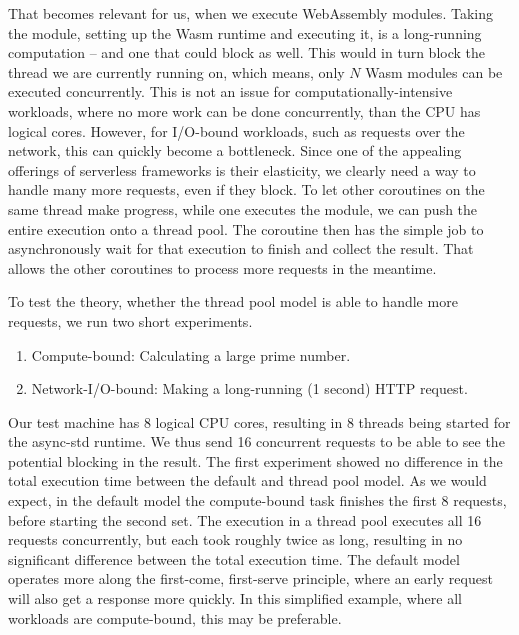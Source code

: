 That becomes relevant for us, when we execute WebAssembly modules. Taking the module, setting up the Wasm runtime and executing it, is a long-running computation -- and one that could block as well. This would in turn block the thread we are currently running on, which means, only $N$ Wasm modules can be executed concurrently. This is not an issue for computationally-intensive workloads, where no more work can be done concurrently, than the CPU has logical cores. However, for I/O-bound workloads, such as requests over the network, this can quickly become a bottleneck. Since one of the appealing offerings of serverless frameworks is their elasticity, we clearly need a way to handle many more requests, even if they block.
To let other coroutines on the same thread make progress, while one executes the module, we can push the entire execution onto a thread pool. The coroutine then has the simple job to asynchronously wait for that execution to finish and collect the result. That allows the other coroutines to process more requests in the meantime.

To test the theory, whether the thread pool model is able to handle more requests, we run two short experiments.

\begin{enumerate}
    \item Compute-bound: Calculating a large prime number.
    \item Network-I/O-bound: Making a long-running (1 second) HTTP request.
\end{enumerate}

Our test machine has 8 logical CPU cores, resulting in 8 threads being started for the async-std runtime. We thus send 16 concurrent requests to be able to see the potential blocking in the result. The first experiment showed no difference in the total execution time between the default and thread pool model. As we would expect, in the default model the compute-bound task finishes the first 8 requests, before starting the second set. The execution in a thread pool executes all 16 requests concurrently, but each took roughly twice as long, resulting in no significant difference between the total execution time. The default model operates more along the first-come, first-serve principle, where an early request will also get a response more quickly. In this simplified example, where all workloads are compute-bound, this may be preferable.

